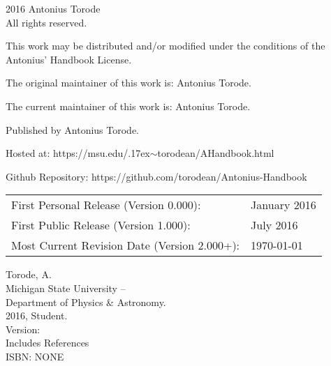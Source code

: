 \pagestyle{empty}
\begingroup
\footnotesize
\parindent 0pt
\parskip \baselineskip
\textcopyright{} 2016 Antonius Torode \\
All rights reserved.

This work may be distributed and/or modified under the conditions of the Antonius' Handbook License.

The original maintainer of this work is: Antonius Torode.

The current maintainer of this work is: Antonius Torode.

Published by Antonius Torode. 

Hosted at: https://msu.edu/{\raise.17ex\hbox{$\scriptstyle\sim$}}torodean/AHandbook.html

Github Repository: https://github.com/torodean/Antonius-Handbook

\begin{center}
\begin{tabular}{ll}
First Personal Release (Version 0.000): & January 2016 \\
First Public Release (Version 1.000): &  July 2016 \\
Most Current Revision Date (Version 2.000+): & \today 
\end{tabular}
\end{center}

\vfill

Torode, A.\\
\hspace*{2em} Michigan State University -- \\
\hspace*{1em} Department of Physics \& Astronomy. \\
\hspace*{2em} 2016, Student. \\
\hspace*{2em} Version: \Version \\
\hspace*{2em} Includes References \\
\hspace*{2em} ISBN: NONE



\endgroup
\clearpage